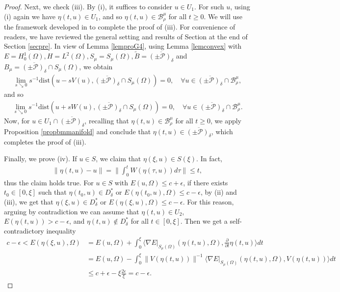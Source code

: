 \documentclass[10pt,a4paper]{article}
\theoremstyle{definition} \theoremstyle{remark}
\numberwithin{equation}{section}
\newcommand{\B}{\mathcal{B}}
\newcommand{\p}{\mathcal{P}}
\begin{document}
\begin{proof}
\vskip0.1in



	Next, we check (iii). By (i), it suffices to consider $u \in U_1$. For such $u$, using (i) again we have $\eta(t,u) \in U_1$,  and so $\eta(t,u) \in \B_\rho^\mu$ for all $t \geq 0$. We will use the framework developed in \cite[Section 4]{JS} to complete the proof of (iii). For convenience of readers, we have reviewed the general setting and results of Section \cite[Section 4]{JS} at the end of Section \ref{secpre}. In view of Lemma \ref{lemproG4}, using Lemma \ref{lemconvex} with $E = H_0^1(\Omega), H = L^2(\Omega), S_\mu = S_\mu(\Omega), \tilde B = \overline{(\pm \p)_\delta}$ and $B_\mu = \overline{(\pm \p)_\delta} \cap S_\mu(\Omega)$, we obtain
	\begin{align*}
		\lim_{s \searrow 0}s^{-1}\text{dist}(u - sV(u), \overline{(\pm \p)_\delta} \cap S_\mu(\Omega)) = 0, \quad \forall u \in \overline{(\pm \p)_\delta} \cap \B_\rho^\mu,
	\end{align*}
    and so
    \begin{align*}
    	\lim_{s \searrow 0}s^{-1}\text{dist}(u + sW(u), \overline{(\pm \p)_\delta} \cap S_\mu(\Omega)) = 0, \quad \forall u \in \overline{(\pm \p)_\delta} \cap \B_\rho^\mu.
    \end{align*}
    Now, for $u \in U_1 \cap \overline{(\pm\p)_\delta}$, recalling that $\eta(t,u) \in \B_\rho^\mu$ for all $t\geq 0$, we apply Proposition \ref{propbmmanifold} and conclude that $\eta(t,u) \in \overline{(\pm\p)_\delta}$, which completes the proof of (iii).

    Finally, we prove (iv). If $u \in S$, we claim that $\eta(\xi,u) \in S(\xi)$. In fact,
    \begin{align*}
    	\|\eta(t,u) - u\| = \|\int_0^t W(\eta(\tau,u))d\tau\| \leq t,
    \end{align*}
    thus the claim holds true. For $u \in S$ with $E(u,\Omega) \leq c + \epsilon$, if there exists $t_0 \in [0,\xi]$ such that $\eta(t_0,u) \in D_\delta^*$ or $E(\eta(t_0,u),\Omega) \leq c - \epsilon$, by (ii) and (iii), we get that $\eta(\xi,u) \in D_\delta^*$ or $E(\eta(\xi,u),\Omega) \leq c - \epsilon$. For this reason, arguing by contradiction we can assume that $\eta(t,u) \in U_2$, $E(\eta(t,u)) > c - \epsilon$, and $\eta(t,u) \notin D_\delta^*$ for all $t \in [0,\xi]$. Then we get a self-contradictory inequality
    \begin{align*}
    	c - \epsilon < E(\eta(\xi,u),\Omega) & = E(u,\Omega) + \int_0^\xi \langle \nabla E|_{S_\mu(\Omega)}(\eta(t,u),\Omega), \frac{\partial}{\partial t}\eta(t,u) \rangle dt \\
    	& = E(u,\Omega) - \int_0^\xi \|V(\eta(t,u))\|^{-1}\langle \nabla E|_{S_\mu(\Omega)}(\eta(t,u),\Omega), V(\eta(t,u)) \rangle dt \\
    	& \leq c + \epsilon - \xi \frac{2\epsilon}{\xi} = c - \epsilon.
    \end{align*}


\end{proof}
\end{document}
